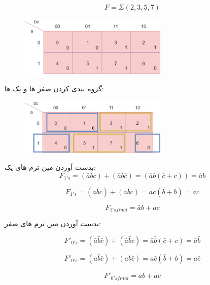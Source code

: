 \documentclass[20pt, a4paper]{article}
\begin{document}
\begin{equation}
	F = \Sigma(2, 3, 5, 7)
\end{equation}

\begin{figure}[htbp]\centering
	\centerline{\includegraphics[width=200pt]{img/karnoughMap/sop_pos_karnough_exp1.png}}
\end{figure}

گروه بندی کردن صفر ها و یک ها:

\begin{figure}[htbp]\centering
	\centerline{\includegraphics[width=200pt]{img/karnoughMap/sop_pos_karnough_exp1_grp.png}}
\end{figure}
بدست آوردن مین ترم های یک:
\begin{equation}
	F_{1's} = (\bar{a}bc)+(\bar{a}b\bar{c}) = (\bar{a}b(\bar{c}+c)) = \bar{a}b
\end{equation}

\begin{equation}
	F_{1's} = (a\bar{b}c) + (abc) = ac(\bar{b}+b) = ac
\end{equation}

\begin{equation}
	F_{1's final} = \bar{a}b + ac
\end{equation}

بدست آوردن مین ترم های صفر:

\begin{equation}
	F'_{0's} = (\bar{a}\bar{b}\bar{c})+(\bar{a}\bar{b}c) = \bar{a}\bar{b}(\bar{c}+c) = \bar{a}\bar{b}
\end{equation}

\begin{equation}
	F'_{0's} = (a\bar{b}\bar{c})+(ab\bar{c}) = a\bar{c}(\bar{b}+b) = a\bar{c}
\end{equation}


\begin{equation}
	F'_{0's final} =  \bar{a}\bar{b} + a\bar{c}
\end{equation}
\end{document}
